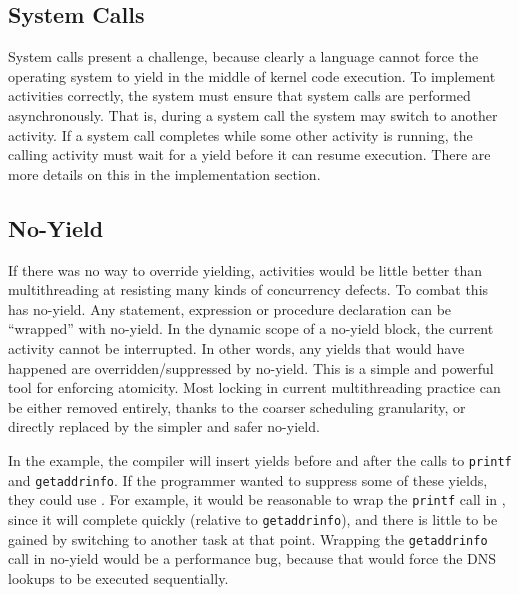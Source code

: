 \documentclass[9pt,preprint]{sigplanconf-2}
\begin{document}

\subsection{System Calls}

System calls present a challenge, because clearly a language cannot force the operating system to yield in the middle of kernel code execution.
To implement activities correctly, the system must ensure that system calls are performed asynchronously.
That is, during a system call the system may switch to another activity.
If a system call completes while some other activity is running, the calling activity must wait for a yield before it can resume execution.
There are more details on this in the implementation section.

\subsection{No-Yield}
\label{sec:noyield}

If there was no way to override yielding, activities would be little better than multithreading at resisting many kinds of concurrency defects.
To combat this \charcoal{} has no-yield.
Any statement, expression or procedure declaration can be ``wrapped'' with no-yield.
In the dynamic scope of a no-yield block, the current activity cannot be interrupted.
In other words, any yields that would have happened are overridden/suppressed by no-yield.
This is a simple and powerful tool for enforcing atomicity.
Most locking in current multithreading practice can be either removed entirely, thanks to the coarser scheduling granularity, or directly replaced by the simpler and safer no-yield.

In the example, the compiler will insert yields before and after the calls to \texttt{printf} and \texttt{getaddrinfo}.
If the programmer wanted to suppress some of these yields, they could use \noyield{}.
For example, it would be reasonable to wrap the \texttt{printf} call in \noyield{}, since it will complete quickly (relative to \texttt{getaddrinfo}), and there is little to be gained by switching to another task at that point.
Wrapping the \texttt{getaddrinfo} call in no-yield would be a performance bug, because that would force the DNS lookups to be executed sequentially.
\end{document}
